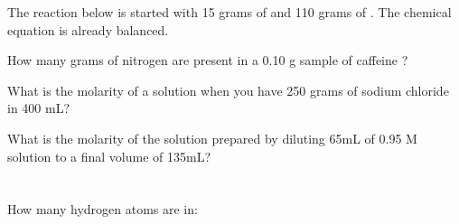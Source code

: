 \documentclass[addpoints, 12pt]{exam}
\begin{document}
\begin{questions}
\newpage

\question[10] The reaction below is started with 15 grams of  and
110 grams of .  The chemical equation is already balanced.

\vspace{5mm}


\question[10] How many grams of nitrogen are present in a 0.10 g
sample of caffeine ?
\vspace{2cm}

\question[10] What is the molarity of a solution when you have 250
grams of sodium chloride  in 400 mL?
\vspace{2cm}

\question[10] What is the molarity of the solution prepared by
diluting 65mL of 0.95 M  solution to a final volume of 135mL?
\vspace{2cm}

\section{}

\question[15] How many hydrogen atoms are in:


\end{questions}
\end{document}
